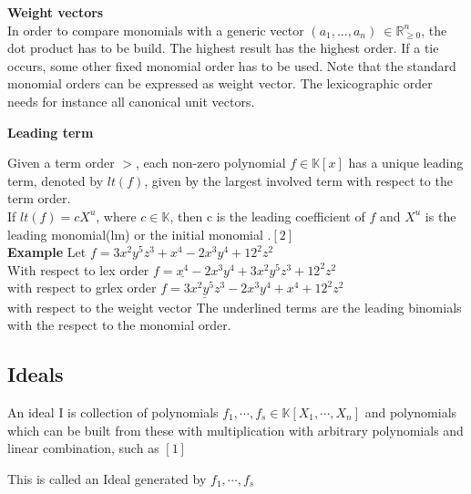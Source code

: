 \textbf{Weight vectors} \\
In order to compare monomials with a generic vector $\left({a}_{1},\dots ,{a}_{n}\right)~\in \mathbb{R}^{n}_{\geq 0}$, the dot product has to be build. The highest result has the highest order. If a tie occurs, some other fixed monomial order has to be used. Note that the standard monomial orders can be expressed as weight vector. The lexicographic order needs for instance all canonical unit vectors.

\textbf{Leading term}

Given a term order $>$, each non-zero polynomial $f \in \mathbb{K}\left[ x\right] $ has a unique leading term, denoted by $lt(f)$, given by the largest involved term with respect to the term order.\\
If $lt(f) = cX^{u}$, where $c \in \mathbb{K}$, then c is the leading coefficient of $f$ and $X^{u}$ is the leading monomial(lm) or the initial monomial .$\left[ 2\right]$\\

\textbf{Example} Let $ f = 3x^{2}y^{5}z^{3} + x^{4} -2x^{3}y^{4} + 12^{2}z^{2}$ \\
With respect to lex order $f = \underline{x^{4}} -2x^{3}y^{4} + 3x^{2}y^{5}z^{3} + 12^{2}z^{2} $ \\
with respect to grlex order $f = \underline{3x^{2}y^{5}z^{3}} -2x^{3}y^{4} + x^{4}+ 12^{2}z^{2}$  \\
with respect to the weight vector 
The underlined terms are the leading binomials with the respect to the monomial order.


\subsection{Ideals}

\begin{env_definition}[Ideal]
An ideal I is collection of polynomials $f_{1}, \cdots , f_{s} \in \mathbb{K}\left[X_{1}, \cdots, X_{n}\right] $ and polynomials which can be built from these with multiplication with arbitrary polynomials and linear combination, such as $\left[1 \right] $

\end{env_definition}
This is called an Ideal generated by $f_{1}, \cdots , f_{s}$ \\

